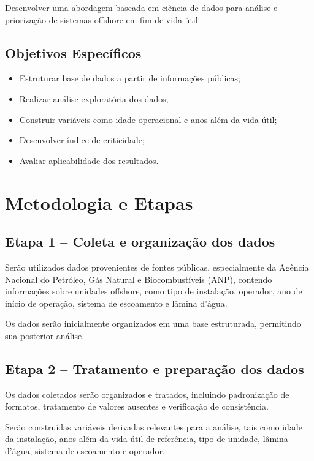 \documentclass[a4paper,12pt]{article}
\begin{document}
Desenvolver uma abordagem baseada em ciência de dados para análise e priorização de sistemas offshore em fim de vida útil.

\subsection*{Objetivos Específicos}

\begin{itemize}
\item Estruturar base de dados a partir de informações públicas;
\item Realizar análise exploratória dos dados;
\item Construir variáveis como idade operacional e anos além da vida útil;
\item Desenvolver índice de criticidade;
\item Avaliar aplicabilidade dos resultados.
\end{itemize}

\section{Metodologia e Etapas}

\subsection*{Etapa 1 – Coleta e organização dos dados}

Serão utilizados dados provenientes de fontes públicas, especialmente da Agência Nacional do Petróleo, Gás Natural e Biocombustíveis (ANP), contendo informações sobre unidades offshore, como tipo de instalação, operador, ano de início de operação, sistema de escoamento e lâmina d’água.

Os dados serão inicialmente organizados em uma base estruturada, permitindo sua posterior análise.

\subsection*{Etapa 2 – Tratamento e preparação dos dados}

Os dados coletados serão organizados e tratados, incluindo padronização de formatos, tratamento de valores ausentes e verificação de consistência.

Serão construídas variáveis derivadas relevantes para a análise, tais como idade da instalação, anos além da vida útil de referência, tipo de unidade, lâmina d’água, sistema de escoamento e operador.
\end{document}

